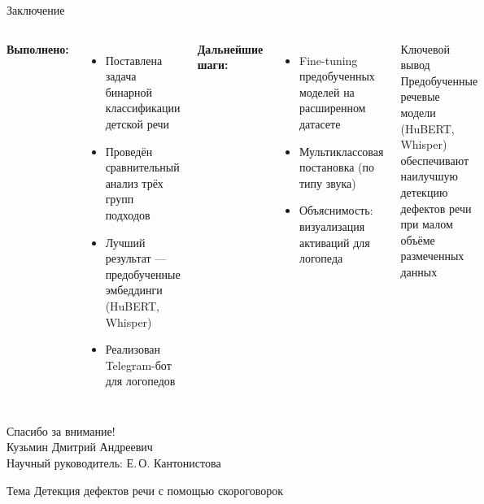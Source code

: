 \documentclass[aspectratio=169]{beamer}
\begin{document}
\begin{frame}{Заключение}
  \begin{columns}[T]
      \textbf{Выполнено:}
      \begin{itemize}
        \item Поставлена задача бинарной классификации детской речи
        \item Проведён сравнительный анализ трёх групп подходов
        \item Лучший результат — предобученные эмбеддинги (HuBERT, Whisper)
        \item Реализован Telegram-бот для логопедов
      \end{itemize}

      \vspace{0.5em}
      \textbf{Дальнейшие шаги:}
      \begin{itemize}
        \item Fine-tuning предобученных моделей на расширенном датасете
        \item Мультиклассовая постановка (по типу звука)
        \item Объяснимость: визуализация активаций для логопеда
      \end{itemize}
      \begin{block}{Ключевой вывод}
        Предобученные речевые модели (HuBERT, Whisper) обеспечивают наилучшую детекцию дефектов речи при малом объёме размеченных данных
      \end{block}
  \end{columns}
\end{frame}

\begin{frame}
  \vfill
  \begin{center}
    {\LARGE Спасибо за внимание!}\\[2em]
    {\large Кузьмин Дмитрий Андреевич}\\[0.5em]
    {\normalsize Научный руководитель: Е.\,О. Кантонистова}\\[2em]
    \begin{block}{\centering Тема}
      \centering
      Детекция дефектов речи с помощью скороговорок
    \end{block}
  \end{center}
  \vfill
\end{frame}
\end{document}
